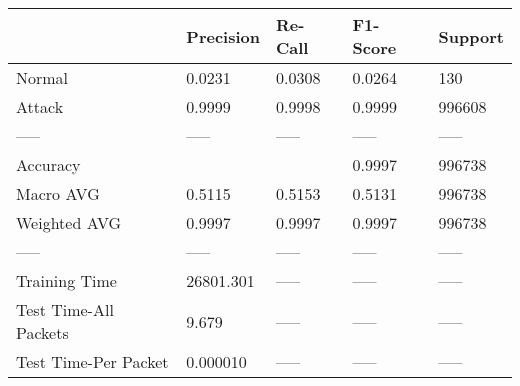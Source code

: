 \begin{tabular}{lllll}
\toprule
{} &  Precision & Re-Call & F1-Score & Support \\
\midrule
Normal                &     0.0231 &  0.0308 &   0.0264 &     130 \\
Attack                &     0.9999 &  0.9998 &   0.9999 &  996608 \\
-----                 &      ----- &   ----- &    ----- &   ----- \\
Accuracy              &            &         &   0.9997 &  996738 \\
Macro AVG             &     0.5115 &  0.5153 &   0.5131 &  996738 \\
Weighted AVG          &     0.9997 &  0.9997 &   0.9997 &  996738 \\
-----                 &      ----- &   ----- &    ----- &   ----- \\
Training Time         &  26801.301 &   ----- &    ----- &   ----- \\
Test Time-All Packets &      9.679 &   ----- &    ----- &   ----- \\
Test Time-Per Packet  &   0.000010 &   ----- &    ----- &   ----- \\
\bottomrule
\end{tabular}
